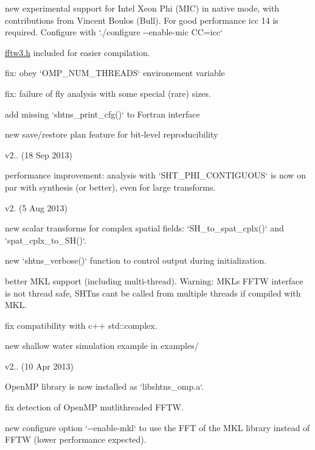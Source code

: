 \begin{DoxyItemize}
\begin{DoxyItemize}
\item new experimental support for Intel Xeon Phi (M\+I\+C) in native mode, with contributions from Vincent Boulos (Bull). For good performance icc 14 is required. Configure with `./configure -\/-\/enable-\/mic C\+C=icc`
\item \hyperlink{fftw3_8h_source}{fftw3.\+h} included for easier compilation.
\item fix\+: obey `\+O\+M\+P\+\_\+\+N\+U\+M\+\_\+\+T\+H\+R\+E\+A\+D\+S` environement variable
\item fix\+: failure of fly analysis with some special (rare) sizes.
\item add missing `shtns\+\_\+print\+\_\+cfg()` to Fortran interface
\item new save/restore plan feature for bit-\/level reproducibility
\end{DoxyItemize}
\item v2.. (18 Sep 2013)
\begin{DoxyItemize}
\item performance improvement\+: analysis with `\+S\+H\+T\+\_\+\+P\+H\+I\+\_\+\+C\+O\+N\+T\+I\+G\+U\+O\+U\+S` is now on par with synthesis (or better), even for large transforms.
\end{DoxyItemize}
\item v2. (5 Aug 2013)
\begin{DoxyItemize}
\item new scalar transforms for complex spatial fields\+: `\+S\+H\+\_\+to\+\_\+spat\+\_\+cplx()` and `spat\+\_\+cplx\+\_\+to\+\_\+\+S\+H()`.
\item new `shtns\+\_\+verbose()` function to control output during initialization.
\item better M\+K\+L support (including multi-\/thread). Warning\+: M\+K\+L\textquotesingle{}s F\+F\+T\+W interface is not thread safe, S\+H\+Tns can\textquotesingle{}t be called from multiple threads if compiled with M\+K\+L.
\item fix compatibility with c++ std\+::complex.
\item new shallow water simulation example in examples/
\end{DoxyItemize}
\item v2.. (10 Apr 2013)
\begin{DoxyItemize}
\item Open\+M\+P library is now installed as `libshtns\+\_\+omp.a`.
\item fix detection of Open\+M\+P mutlithreaded F\+F\+T\+W.
\item new configure option `-\/-\/enable-\/mkl` to use the F\+F\+T of the M\+K\+L library instead of F\+F\+T\+W (lower performance expected).

\end{DoxyItemize}
\end{DoxyItemize}
